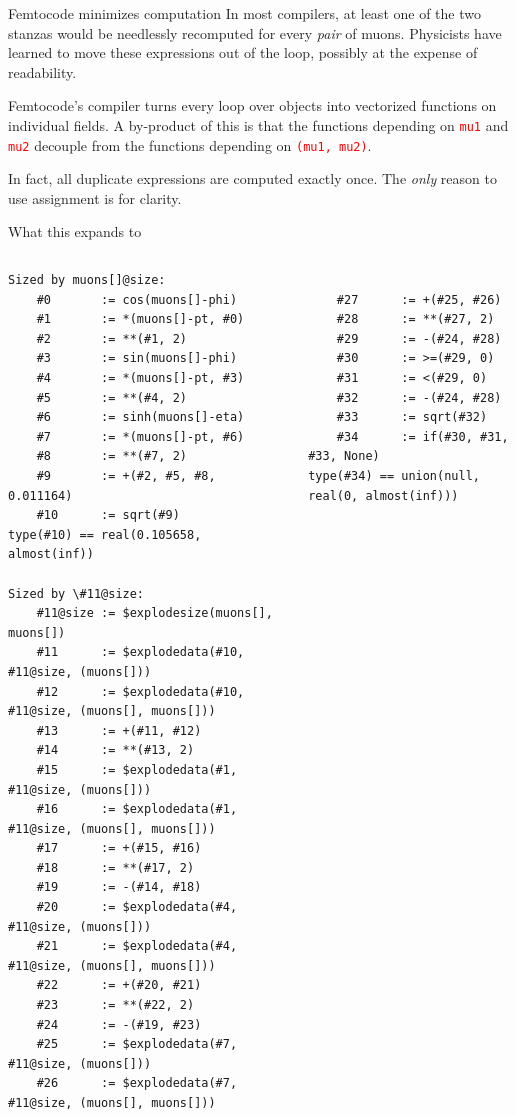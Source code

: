 \documentclass{beamer}
\begin{document}
\begin{frame}{Femtocode minimizes computation}
In most compilers, at least one of the two stanzas would be needlessly recomputed for every {\it pair} of muons. Physicists have learned to move these expressions out of the loop, possibly at the expense of readability.

\vfill
Femtocode's compiler turns every loop over objects into vectorized functions on individual fields. A by-product of this is that the functions depending on \textcolor{red}{\tt mu1} and \textcolor{red}{\tt mu2} decouple from the functions depending on \textcolor{red}{\tt (mu1, mu2)}.

\vfill
In fact, all duplicate expressions are computed exactly once. The {\it only} reason to use assignment is for clarity.
\end{frame}

\begin{frame}[fragile]{What this expands to}
\begin{columns}[t]
\tiny
\begin{Verbatim}[commandchars=\\\{\}]
Sized by muons[]@size:
    #0       := cos(muons[]-phi)
    #1       := *(muons[]-pt, #0)
    #2       := **(#1, 2)
    #3       := sin(muons[]-phi)
    #4       := *(muons[]-pt, #3)
    #5       := **(#4, 2)
    #6       := sinh(muons[]-eta)
    #7       := *(muons[]-pt, #6)
    #8       := **(#7, 2)
    #9       := +(#2, #5, #8, 0.011164)
    #10      := sqrt(#9)
type(#10) == real(0.105658, almost(inf))

Sized by \#11@size:
    #11@size := $explodesize(muons[], muons[])
    #11      := $explodedata(#10, #11@size, (muons[]))
    #12      := $explodedata(#10, #11@size, (muons[], muons[]))
    #13      := +(#11, #12)
    #14      := **(#13, 2)
    #15      := $explodedata(#1, #11@size, (muons[]))
    #16      := $explodedata(#1, #11@size, (muons[], muons[]))
    #17      := +(#15, #16)
    #18      := **(#17, 2)
    #19      := -(#14, #18)
    #20      := $explodedata(#4, #11@size, (muons[]))
    #21      := $explodedata(#4, #11@size, (muons[], muons[]))
    #22      := +(#20, #21)
    #23      := **(#22, 2)
    #24      := -(#19, #23)
    #25      := $explodedata(#7, #11@size, (muons[]))
    #26      := $explodedata(#7, #11@size, (muons[], muons[]))
\end{Verbatim}

\tiny
\begin{Verbatim}[commandchars=\\\{\}]

    #27      := +(#25, #26)
    #28      := **(#27, 2)
    #29      := -(#24, #28)
    #30      := >=(#29, 0)
    #31      := <(#29, 0)
    #32      := -(#24, #28)
    #33      := sqrt(#32)
    #34      := if(#30, #31, #33, None)
type(#34) == union(null, real(0, almost(inf)))
\end{Verbatim}
\end{columns}
\end{frame}
\end{document}
